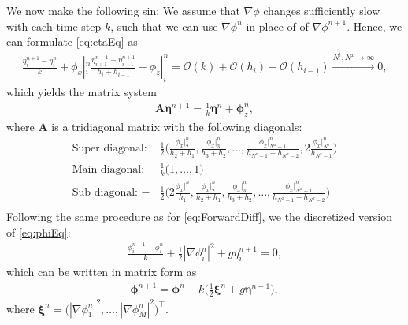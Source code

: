 \documentclass[12pt]{article}
\begin{document}
We now make the following sin: We assume that $\nabla \phi$ changes sufficiently slow with each time step $k$, such that we can use $\nabla \phi^n$
in place of of $\nabla \phi^{n+1}$. Hence, we can formulate \eqref{eq:etaEq} as
\begin{align*}
    \frac{\eta_i^{n+1} - \eta_i^n}{k} + \phi_x|_i^{n} \frac{\eta_{i+1}^{n+1}-\eta_{i-1}^{n+1}}{h_i + h_{i-1}} - \phi_z|_i^n
                       = \mathcal{O}(k) + \mathcal{O}(h_i) + \mathcal{O}(h_{i-1}) \xrightarrow{N^t, N^x \rightarrow \infty} 0,
\end{align*}
which yields the matrix system
\begin{align}
    \label{eq:etan+1}
    \bm{A} \bm{\eta}^{n+1} = \frac{1}{k}\bm{\eta}^n + \bm{\phi}_z^n,
\end{align}
where $\bm{A}$ is a tridiagonal matrix with the following diagonals:
\begin{align*}
    \text{Super diagonal: } &\frac{1}{2} \bigg(\frac{\phi_x|_2^{n}}{h_2 + h_1}, \frac{\phi_x|_3^{n}}{h_3+h_2},
                                        \dots, \frac{\phi_x|_{N^x-1}^n}{h_{N^x-1} + h_{N^x-2}}, 2\frac{\phi_x|_{N^x}^n}{h_{N^x-1}}\bigg) \\
    \text{Main diagonal: }  &\frac{1}{k}  \Big(1, \dots, 1\Big)                                        \\
    \text{Sub diagonal: }  -&\frac{1}{2} \bigg(2\frac{\phi_x|_1^{n}}{h_1}, \frac{\phi_x|_2^{n}}{h_2+h_1}, \frac{\phi_x|_3^n}{h_3 + h_2},
                                        \dots, \frac{\phi_x|_{N^x-1}^n}{h_{N^x-1} + h_{N^x-2}}\bigg) \\
\end{align*}
%
Following the same procedure as for \eqref{eq:ForwardDiff}, we the discretized version of \eqref{eq:phiEq}:
\begin{align*}
    \frac{\phi_i^{n+1}-\phi_i^n}{k} + \frac{1}{2}|\nabla \phi_i^n|^2 + g \eta_i^{n+1} = 0,
\end{align*}
which can be written in matrix form as
\begin{align}
    \label{eq:phin+1}
    \bm{\phi}^{n+1} = \bm{\phi}^n - k\bigg(\frac{1}{2}\bm{\xi}^n + g \bm{\eta}^{n+1}\bigg),
\end{align}
where $\bm{\xi}^n = \Big(|\nabla \phi_1^n|^2, \dots,  |\nabla \phi_M^n|^2\bigg)^\top$.
\end{document}
